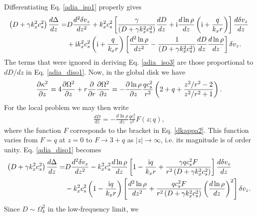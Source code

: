 Differentiating Eq. \ref{adia_iso1} properly gives
\begin{align}
  \left(D + \gamma k_x^2 c_s^2\right)\frac{d\Delta}{dz}=& D
  \frac{d^2\delta v_z}{dz^2} + k_x^2c_s^2\left[\frac{\gamma}{\left(D + \gamma k_x^2 c_s^2\right)}\frac{dD}{dz} + \mathrm{i}
    \frac{d\ln\rho}{dz}\left(\mathrm{i} +
      \frac{q}{k_xr}\right)\right]\frac{d\delta v_z}{dz}\notag\\
  &+ \mathrm{i} k_x^2 c_s^2 \left(\mathrm{i} +
      \frac{q}{k_xr}\right)\left[\frac{d^2\ln\rho}{dz^2} -
      \frac{1}{\left(D + \gamma
          k_x^2c_s^2\right)}\frac{dD}{dz}\frac{d\ln\rho}{dz}\right]\delta
    v_z. \label{adia_diso1}
\end{align}
The terms that were ignored in deriving Eq. \ref{adia_iso3} are those
proportional to $dD/dz$ in Eq. \ref{adia_diso1}. Now, in the global
disk we have
\begin{align}\label{dkappa2}
  \frac{\partial\kappa^2}{\partial z} = 4 \frac{\partial\Omega^2}{\partial z} + r\frac{\partial}{\partial
    r}\frac{\partial\Omega^2}{\partial z} = -
  \frac{\partial\ln\rho}{\partial z}\frac{qc_s^2}{r^2} \left(2 + q +
    \frac{z^2/r^2-2}{z^2/r^2+1}\right). 
\end{align}
For the local problem we may then write
\begin{align}
  \frac{dD}{dz}  = - \frac{d\ln\rho}{dz}\frac{qc_s^2}{r^2}F(z;q),
\end{align}
where the function $F$ corresponds to the bracket in
Eq. \ref{dkappa2}. This function varies from $F=q$ at $z=0$ to $F\to
3+q$ as $|z|\to\infty$, i.e. its magnitude is of order unity. 
Eq. \ref{adia_diso1} becomes
\begin{align}
\left(D + \gamma k_x^2 c_s^2\right)\frac{d\Delta}{dz}=& D
  \frac{d^2\delta v_z}{dz^2} - k_x^2c_s^2\frac{d\ln\rho}{dz}\left[ 1 - 
      \frac{\mathrm{i} q}{k_xr}  +  \frac{\gamma q c_s^2F}{r^2\left(D +
        \gamma k_x^2 c_s^2\right)}\right]\frac{d\delta
    v_z}{dz}\notag\\ 
  &- k_x^2 c_s^2 \left(1 - 
      \frac{\mathrm{i} q}{k_xr}\right)\left[\frac{d^2\ln\rho}{dz^2} + 
      \frac{qc_s^2F}{r^2\left(D + \gamma
          k_x^2c_s^2\right)}\left(\frac{d\ln\rho}{dz}\right)^2\right]\delta
    v_z. \label{adia_diso2}
\end{align}
Since $D\sim \Omega_k^2$ in the low-frequency limit, we 
